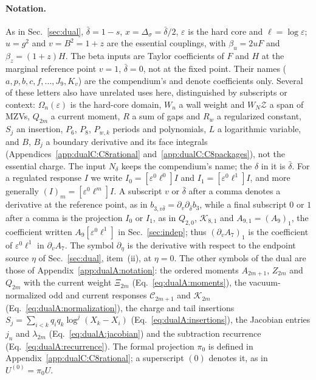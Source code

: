 \documentclass[11pt,a4paper]{article}
\numberwithin{equation}{section}
\newcommand{\Ds}{\Delta_\sigma}
\newcommand{\db}{\bar\delta}
\begin{document}
\paragraph{Notation.} As in Sec.~\ref{sec:dual}, $\db=1-s$, $x=\Ds=\db/2$, $\varepsilon$ is the hard core and
$\ell=\log\varepsilon$; $u=g^2$ and $v=B^2=1+z$ are the essential couplings, with $\beta_u=2uF$ and $\beta_z=(1+z)H$.
The beta inputs are Taylor coefficients of $F$ and $H$ at the marginal reference point $v=1$, $\db=0$, not at the
fixed point. Their names ($a,p,b,c,f,\dots,J_9,K_v$) are the compendium's and denote coefficients only. Several of these letters
also have unrelated uses here, distinguished by subscripts or context: $\Omega_n(\varepsilon)$ is the hard-core domain,
$W_n$ a wall weight and $W_N\mathcal Z$ a span of MZVs, $Q_{2m}$ a current moment, $R$ a sum of gaps and $R_w$ a
regularized constant, $S_j$ an insertion, $P_6$, $P_8$, $P_{w,k}$ periods and polynomials, $L$ a logarithmic
variable, and $B$, $B_j$ a boundary derivative and its face integrals (Appendices~\ref{app:dualC:C8rational}
and~\ref{app:dualC:C8packages}), not the essential charge. The input $N_\delta$ keeps the
compendium's name; the $\delta$ in it is $\db$. For a regulated response $I$ we write $I_0=[\varepsilon^0\ell^0]I$
and $I_1=[\varepsilon^0\ell^1]I$, and more generally $(I)_m=[\varepsilon^0\ell^m]I$. A subscript $v$ or $\db$ after a
comma denotes a derivative at the reference point, as in $b_{3,v\db}=\partial_v\partial_{\db}b_3$, while a final
subscript $0$ or $1$ after a comma is the projection $I_0$ or $I_1$, as in $Q_{2,0}$, $\mathcal K_{8,1}$ and
$A_{9,1}=(A_9)_1$, the coefficient written $A_9[\varepsilon^0\ell^1]$ in Sec.~\ref{sec:indep}; thus $(\partial_vA_7)_1$
is the coefficient of $\varepsilon^0\ell^1$ in $\partial_vA_7$. The symbol $\partial_\eta$ is the derivative with respect to the
endpoint source $\eta$ of Sec.~\ref{sec:dual}, item~(ii), at $\eta=0$. The other symbols of the dual are those of
Appendix~\ref{app:dualA:notation}: the ordered moments $A_{2m+1}$, $Z_{2m}$ and $Q_{2m}$ with the current weight
$\Xi_{2m}$ (Eq.~\eqref{eq:dualA:moments}), the vacuum-normalized odd and current
responses $\mathcal C_{2m+1}$ and $\mathcal K_{2m}$ (Eq.~\eqref{eq:dualA:normalization}), the charge and tail
insertions $S_j=\sum_{i<k}q_iq_k\log^j(X_k-X_i)$ (Eq.~\eqref{eq:dualA:insertions}), the Jacobian entries $j_n$ and
$\lambda_{2m}$ (Eq.~\eqref{eq:dualA:jacobian}) and the subtraction recurrence (Eq.~\eqref{eq:dualA:recurrence}).
The formal projection $\pi_0$ is defined in Appendix~\ref{app:dualC:C8rational}; a superscript $(0)$ denotes it, as in
$U^{(0)}=\pi_0U$.
\end{document}
